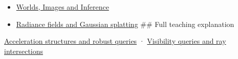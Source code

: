 \begin{itemize}
\item
  \href{Continuous\%20Notes/University\%20-\%20Worlds,\%20Images\%20and\%20Inference\%20-\%20Graphics,\%20Vision\%20and\%20Photography}{Worlds, Images and Inference}
\item
  \hyperref[appendix-c5b332e400e7]{Radiance fields and Gaussian splatting} \#\# Full teaching explanation
\end{itemize}

\href{Continuous\%20Notes/University\%20-\%20Worlds,\%20Images\%20and\%20Inference\%20-\%20Graphics,\%20Vision\%20and\%20Photography\#Acceleration\%20structures\%20and\%20robust\%20queries}{Acceleration structures and robust queries} · \href{Continuous\%20Notes/University\%20-\%20Worlds,\%20Images\%20and\%20Inference\%20-\%20Graphics,\%20Vision\%20and\%20Photography\#Visibility\%20queries\%20and\%20ray\%20intersections}{Visibility queries and ray intersections}
